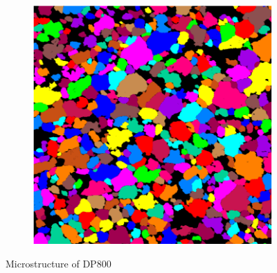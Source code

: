 \documentclass{article}
\begin{document}
\begin{figure}[h!]
\begin{subfigure}[b]{0.3\textwidth}
         \caption{}
         \label{fig:Micro2_800}
     \end{subfigure}
          \hfill
     \begin{subfigure}[b]{0.3\textwidth}
         \centering
         \includegraphics[width=\textwidth]{Micro3_800.png}
         \caption{}
         \label{fig:Micro3_800}
     \end{subfigure}
     \caption{Microstructure of DP800}
     \label{fig:Micro_800}
\end{figure}
\end{document}
